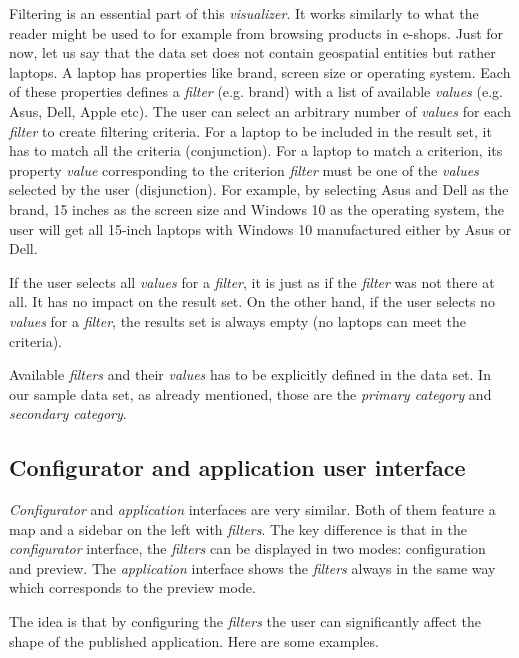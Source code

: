 Filtering is an essential part of this \emph{visualizer}. It works similarly to what the reader might be used to for example from browsing products in e-shops. Just for now, let us say that the data set does not contain geospatial entities but rather laptops. A laptop has properties like brand, screen size or operating system. Each of these properties defines a \emph{filter} (e.g. brand) with a list of available \emph{values} (e.g. Asus, Dell, Apple etc). The user can select an arbitrary number of \emph{values} for each \emph{filter} to create filtering criteria. For a laptop to be included in the result set, it has to match all the criteria (conjunction). For a laptop to match a criterion, its property \emph{value} corresponding to the criterion \emph{filter} must be one of the \emph{values} selected by the user (disjunction). For example, by selecting Asus and Dell as the brand, 15 inches as the screen size and Windows 10 as the operating system, the user will get all 15-inch laptops with Windows 10 manufactured either by Asus or Dell.

If the user selects all \emph{values} for a \emph{filter}, it is just as if the \emph{filter} was not there at all. It has no impact on the result set. On the other hand, if the user selects no \emph{values} for a \emph{filter}, the results set is always empty (no laptops can meet the criteria).

Available \emph{filters} and their \emph{values} has to be explicitly defined in the data set. In our sample data set, as already mentioned, those are the \emph{primary category} and \emph{secondary category}.

\subsection{Configurator and application user interface}

\emph{Configurator} and \emph{application} interfaces are very similar. Both of them feature a map and a sidebar on the left with \emph{filters}. The key difference is that in the \emph{configurator} interface, the \emph{filters} can be displayed in two modes: configuration and preview. The \emph{application} interface shows the \emph{filters} always in the same way which corresponds to the preview mode.

The idea is that by configuring the \emph{filters} the user can significantly affect the shape of the published application. Here are some examples.

